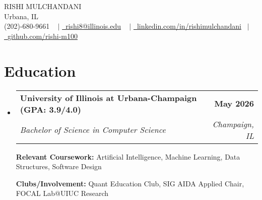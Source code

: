 \documentclass[letterpaper,11pt]{article}
\makeatletter
\newcommand{\resumeSubheading}[4]{
  \vspace{-2pt}\item
    \begin{tabular*}{1.0\textwidth}[t]{l@{\extracolsep{\fill}}r}
      \textbf{#1} & \textbf{\small #2} \\
      \textit{\small#3} & \textit{\small #4} \\
    \end{tabular*}\vspace{-7pt}
}
\newcommand{\resumeSubHeadingListStart}{\begin{itemize}[leftmargin=0.0in, label={}]}
\newcommand{\resumeSubHeadingListEnd}{\end{itemize}}
\makeatother
\begin{document}


\begin{center}
    {\Huge \scshape  RISHI MULCHANDANI  } \\ \vspace{1pt}
                \vspace{-1pt}
    Urbana, IL \\ \vspace{0pt}
            \vspace{0pt}
    \small \raisebox{-0.1\height} (202)-680-9661 ~ $\vert$ \href{mailto:rishi8@illinois.edu}{\raisebox{-0.2\height}\ \underline{rishi8@illinois.edu}} ~ $\vert$
        \vspace{4pt}
    \href{https://linkedin.com/in/rishimulchandani}{\raisebox{-0.2\height}\ \underline{linkedin.com/in/rishimulchandani}}  ~$\vert$
    \href{https://github.com/rishi-m100}{\raisebox{-0.2\height}\ \underline{github.com/rishi-m100}}

    \vspace{-14pt}
\end{center}


\section{Education}
  \resumeSubHeadingListStart
    \resumeSubheading
      {University of Illinois at Urbana-Champaign (GPA: 3.9/4.0)}{May 2026}
      {Bachelor of Science in Computer Science}{Champaign, IL}
          \vspace{-2pt}

    {\textbf{Relevant Coursework:}  Artificial Intelligence, Machine Learning, Data Structures, Software Design}
          \vspace{-2pt}

    {\textbf{Clubs/Involvement:} Quant Education Club, SIG AIDA Applied Chair, FOCAL Lab@UIUC Research}

  \resumeSubHeadingListEnd

\end{document}
